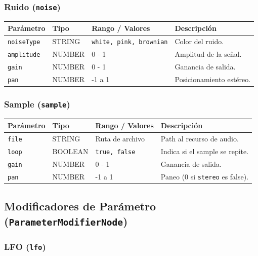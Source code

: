 \subsubsection{Ruido (\texttt{noise})}

\begin{table}[H]
\centering
\small
\begin{tabular}{@{}llp{3cm}p{4cm}@{}}
\toprule
Parámetro & Tipo & Rango / Valores & Descripción \\ \midrule
\texttt{noiseType} & STRING & \texttt{white, pink, brownian} & Color del ruido. \\
\texttt{amplitude} & NUMBER & 0 - 1 & Amplitud de la señal. \\
\texttt{gain} & NUMBER & 0 - 1 & Ganancia de salida. \\
\texttt{pan} & NUMBER & -1 a 1 & Posicionamiento estéreo. \\ \bottomrule
\end{tabular}
\end{table}

\subsubsection{Sample (\texttt{sample})}

\begin{table}[H]
\centering
\small
\begin{tabular}{@{}llp{3cm}p{4cm}@{}}
\toprule
Parámetro & Tipo & Rango / Valores & Descripción \\ \midrule
\texttt{file} & STRING & Ruta de archivo & Path al recurso de audio. \\
\texttt{loop} & BOOLEAN & \texttt{true, false} & Indica si el sample se repite. \\
\texttt{gain} & NUMBER & 0 - 1 & Ganancia de salida. \\
\texttt{pan} & NUMBER & -1 a 1 & Paneo (0 si \texttt{stereo} es false). \\ \bottomrule
\end{tabular}
\end{table}

\subsection{Modificadores de Parámetro (\texttt{ParameterModifierNode})}

\subsubsection{LFO (\texttt{lfo})}

